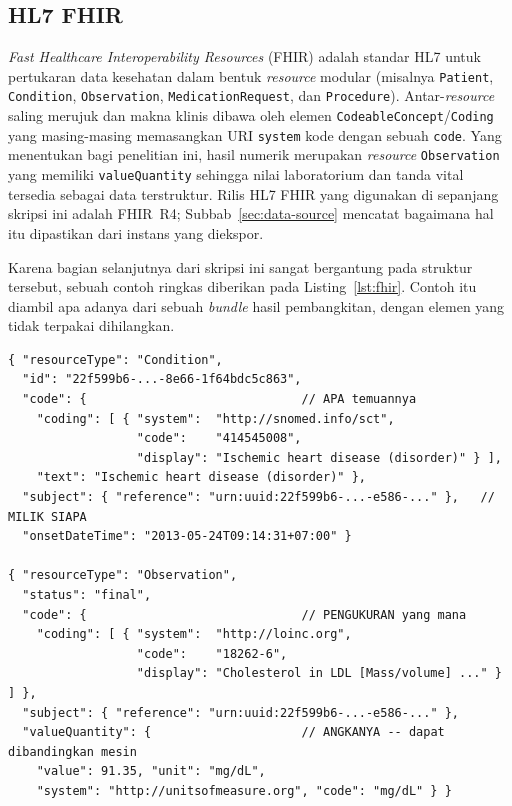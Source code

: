 \subsection{HL7 FHIR}
\emph{Fast Healthcare Interoperability Resources} (FHIR) \cite{fhir_r4} adalah standar HL7
untuk pertukaran data kesehatan dalam bentuk \emph{resource} modular (misalnya
\texttt{Patient}, \texttt{Condition}, \texttt{Observation}, \texttt{MedicationRequest}, dan
\texttt{Procedure}). Antar-\emph{resource} saling merujuk dan makna klinis dibawa oleh elemen
\texttt{CodeableConcept}/\texttt{Coding} yang masing-masing memasangkan URI \texttt{system}
kode dengan sebuah \texttt{code}. Yang menentukan bagi penelitian ini, hasil numerik merupakan
\emph{resource} \texttt{Observation} yang memiliki \texttt{valueQuantity} sehingga
nilai laboratorium dan tanda vital tersedia sebagai data terstruktur. Rilis HL7 FHIR yang digunakan di
sepanjang skripsi ini adalah FHIR~R4; Subbab~\ref{sec:data-source} mencatat bagaimana hal itu
dipastikan dari instans yang diekspor.

Karena bagian selanjutnya dari skripsi ini sangat bergantung pada struktur tersebut, sebuah
contoh ringkas diberikan pada Listing~\ref{lst:fhir}. Contoh itu diambil apa adanya dari
sebuah \emph{bundle} hasil pembangkitan, dengan elemen yang tidak terpakai dihilangkan.

\begin{lstlisting}[caption={Cuplikan ringkas \emph{resource} FHIR R4 dari \emph{bundle}
pasien hasil pembangkitan: sebuah diagnosis berkode dan sebuah hasil laboratorium numerik.},
label={lst:fhir},
basicstyle=\ttfamily\scriptsize,breaklines=true,frame=single,captionpos=b]
{ "resourceType": "Condition",
  "id": "22f599b6-...-8e66-1f64bdc5c863",
  "code": {                              // APA temuannya
    "coding": [ { "system":  "http://snomed.info/sct",
                  "code":    "414545008",
                  "display": "Ischemic heart disease (disorder)" } ],
    "text": "Ischemic heart disease (disorder)" },
  "subject": { "reference": "urn:uuid:22f599b6-...-e586-..." },   // MILIK SIAPA
  "onsetDateTime": "2013-05-24T09:14:31+07:00" }

{ "resourceType": "Observation",
  "status": "final",
  "code": {                              // PENGUKURAN yang mana
    "coding": [ { "system":  "http://loinc.org",
                  "code":    "18262-6",
                  "display": "Cholesterol in LDL [Mass/volume] ..." } ] },
  "subject": { "reference": "urn:uuid:22f599b6-...-e586-..." },
  "valueQuantity": {                     // ANGKANYA -- dapat dibandingkan mesin
    "value": 91.35, "unit": "mg/dL",
    "system": "http://unitsofmeasure.org", "code": "mg/dL" } }
\end{lstlisting}

